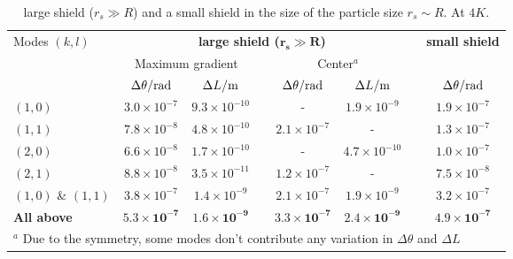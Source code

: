 \begin{table}[!htbp]
  \centering
  \caption{large shield ($r_s \gg R$) and a small shield in the size of the particle size $r_s\sim R$. At $4\si{K}$.}
  \begin{tabular}{l c c c c c c c}
    \toprule
    \multirow{3}{*}{Modes $(k,l)$} & \multicolumn{5}{c}{\textbf{large shield ($\mathbf{r_s \gg R}$)}} & & \textbf{small shield} \\ %
    \cline{2-6} \cline{8-8}
    & \multicolumn{2}{c}{Maximum gradient} && \multicolumn{2}{c}{Center$^a$} && \\ %
    \cline{2-3} \cline{5-6}
    & $\Delta \theta/\mathrm{rad}$ & $\Delta L/\mathrm{m}$ && $\Delta \theta/\mathrm{rad}$ & $\Delta L/\mathrm{m}$ && $\Delta \theta/\mathrm{rad}$ \\
    \midrule
    $(1,0)$ & $3.0 \times 10^{-7}$ & $9.3 \times 10^{-10}$ && - & $1.9 \times 10^{-9}$ && $1.9 \times 10^{-7}$ \\
    $(1,1)$ & $7.8 \times 10^{-8}$ & $4.8 \times 10^{-10}$ && $2.1 \times 10^{-7}$ & - && $1.3 \times 10^{-7}$ \\
    $(2,0)$ & $6.6 \times 10^{-8}$ & $1.7 \times 10^{-10}$ && - & $4.7 \times 10^{-10}$ && $1.0 \times 10^{-7}$ \\
    $(2,1)$ & $8.8 \times 10^{-8}$ & $3.5 \times 10^{-11}$ && $1.2 \times 10^{-7}$ & - && $7.5 \times 10^{-8}$ \\
    \hline
    $(1,0)$ \& $(1,1)$ & $3.8 \times 10^{-7}$ & $1.4 \times 10^{-9}$ && $2.1 \times 10^{-7}$ & $1.9 \times 10^{-9}$ && $3.2 \times 10^{-7}$\\
    \textbf{All above} & $\mathbf{5.3 \times 10^{-7}}$ & $\mathbf{1.6 \times 10^{-9}}$ && $\mathbf{3.3 \times 10^{-7}}$ & $\mathbf{2.4 \times 10^{-9}}$ && $\mathbf{4.9 \times 10^{-7}}$\\
    \bottomrule
    \multicolumn{8}{l}{\footnotesize $^a$ Due to the symmetry, some modes don't contribute any variation in $\Delta\theta$ and $\Delta L$}
  \end{tabular}
\end{table}